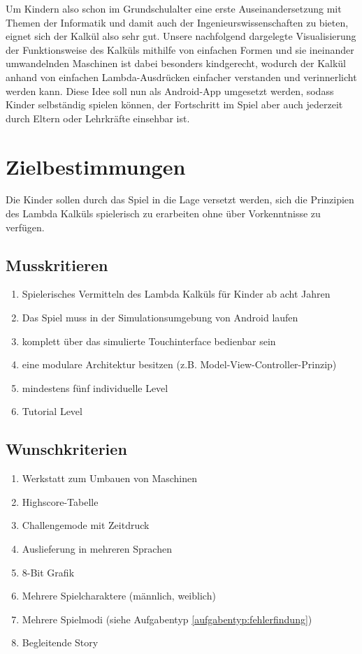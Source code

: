 \documentclass{scrartcl}
\begin{document}
Um Kindern also schon im Grundschulalter eine erste Auseinandersetzung
mit Themen der Informatik und damit auch der Ingenieurswissenschaften
zu bieten, eignet sich der Kalkül also sehr gut. Unsere nachfolgend
dargelegte Visualisierung der Funktionsweise des Kalküls mithilfe
von einfachen Formen und sie ineinander umwandelnden Maschinen ist
dabei besonders kindgerecht, wodurch der Kalkül anhand von einfachen
Lambda-Ausdrücken einfacher verstanden und verinnerlicht werden kann.
Diese Idee soll nun als Android-App umgesetzt werden, sodass Kinder
selbständig spielen können, der Fortschritt im Spiel aber auch jederzeit
durch Eltern oder Lehrkräfte einsehbar ist. 

\clearpage

\section{Zielbestimmungen}


Die Kinder sollen durch das Spiel in die Lage versetzt werden, sich die Prinzipien des Lambda Kalküls spielerisch zu erarbeiten ohne über Vorkenntnisse zu verfügen.

\subsection{Musskritieren}

\begin{enumerate}
	\item Spielerisches Vermitteln des Lambda Kalküls für Kinder ab acht Jahren
	\item Das Spiel muss in der Simulationsumgebung von Android laufen
	\item komplett über das simulierte Touchinterface bedienbar sein
	\item eine modulare Architektur besitzen (z.B. Model-View-Controller-Prinzip)
	\item mindestens fünf individuelle Level
	\item Tutorial Level
\end{enumerate}

\subsection{Wunschkriterien}

\begin{enumerate}
	\item \label{wunsch:werkstatt}Werkstatt zum Umbauen von Maschinen
	\item \label{wunsch:highscore}Highscore-Tabelle
	\item \label{wunsch:challengemode}Challengemode mit Zeitdruck
	\item \label{wunsch:multilang}Auslieferung in mehreren Sprachen
	\item \label{wunsch:8bit}8-Bit Grafik
	\item \label{wunsch:multiplechar}Mehrere Spielcharaktere (männlich, weiblich)
	\item \label{wunsch:multiplemode}Mehrere Spielmodi (siehe Aufgabentyp \ref{aufgabentyp:fehlerfindung})
    \item \label{wunsch:story} Begleitende Story
\end{enumerate}
\end{document}
